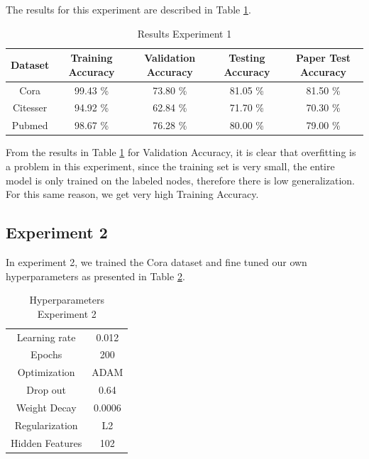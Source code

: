  The results for this experiment are described in Table \ref{tab:results1}.

\begin {table}[ht]
  \begin{center}
    \begin{tabular}{|c|c|c|c|c|}
    \hline
    Dataset    &  Training Accuracy & Validation Accuracy & Testing Accuracy & Paper Test Accuracy \\ \hline
    Cora          & 99.43 \% & 73.80 \%  & 81.05 \% & 81.50 \% \\ 
    Citesser      & 94.92 \% & 62.84 \%  & 71.70 \% & 70.30 \% \\
    Pubmed        & 98.67 \% & 76.28 \%  & 80.00 \% & 79.00 \% \\
    \hline
    \end{tabular}
  \end{center}
\caption {Results Experiment 1} \label{tab:results1} 
\end{table}

From the results in Table \ref{tab:results1} for Validation Accuracy, it is clear that overfitting is a problem in this experiment, since the training set is very small, the entire model is only trained on the labeled nodes, therefore there is low generalization. For this same reason, we get very high Training Accuracy. 

\subsection{Experiment 2}
In experiment 2, we trained the Cora dataset and fine tuned our own hyperparameters as presented in Table \ref{tab:hyperparameters2}.

\begin {table}[ht]
  \begin{center}
    \begin{tabular}{|c|c|}
    \hline
    Learning rate     & 0.012 \\ 
    Epochs            & 200  \\ 
    Optimization      & ADAM \\
    Drop out          & 0.64   \\
    Weight Decay      & 0.0006 \\
    Regularization    & L2    \\
    Hidden Features   & 102   \\
    \hline
    \end{tabular}
  \end{center}
\caption {Hyperparameters Experiment 2} \label{tab:hyperparameters2} 
\end{table}

